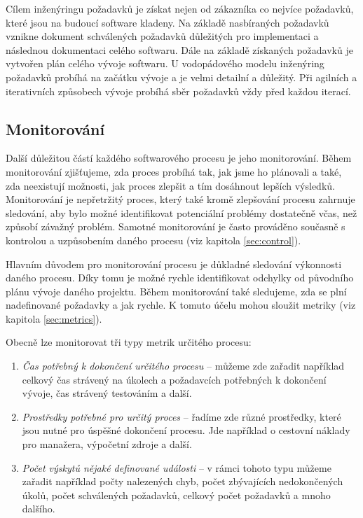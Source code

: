 \documentclass[czech,master,public,dept460,male,cpdeclaration,oneside]{diploma}
\begin{document}
Cílem inženýringu požadavků je získat nejen od zákazníka co nejvíce požadavků, které jsou na budoucí software kladeny. Na základě nasbíraných požadavků vznikne dokument schválených požadavků důležitých pro implementaci a následnou dokumentaci celého softwaru. Dále na základě získaných požadavků je vytvořen plán celého vývoje softwaru. U vodopádového modelu inženýring požadavků probíhá na začátku vývoje a je velmi detailní a důležitý. Při agilních a iterativních způsobech vývoje probíhá sběr požadavků vždy před každou iterací.

\subsection{Monitorování}
Další důležitou částí každého softwarového procesu je jeho monitorování. Během monitorování zjišťujeme, zda proces probíhá tak, jak jsme ho plánovali a také, zda neexistují možnosti, jak proces zlepšit a tím dosáhnout lepších výsledků. Monitorování je nepřetržitý proces, který také kromě zlepšování procesu zahrnuje sledování, aby bylo možné identifikovat potenciální problémy dostatečně včas, než způsobí závažný problém. Samotné monitorování je často prováděno současně s kontrolou a uzpůsobením daného procesu (viz kapitola \ref{sec:control}).

Hlavním důvodem pro monitorování procesu je důkladné sledování výkonnosti daného procesu. Díky tomu je možné rychle identifikovat odchylky od původního plánu vývoje daného projektu. Během monitorování také sledujeme, zda se plní nadefinované požadavky a jak rychle. K tomuto účelu mohou sloužit metriky (viz kapitola \ref{sec:metrics}).

Obecně lze monitorovat tři typy metrik určitého procesu:

\begin{enumerate}
\item \textit{Čas potřebný k dokončení určitého procesu} -- můžeme zde zařadit například celkový čas strávený na úkolech a požadavcích potřebných k dokončení vývoje, čas strávený testováním a další.

\item \textit{Prostředky potřebné pro určitý proces} -- řadíme zde různé prostředky, které jsou nutné pro úspěšné dokončení procesu. Jde například o cestovní náklady pro manažera, výpočetní zdroje a další.

\item \textit{Počet výskytů nějaké definované události} -- v rámci tohoto typu můžeme zařadit například počty nalezených chyb, počet zbývajících nedokončených úkolů, počet schválených požadavků, celkový počet požadavků a mnoho dalšího.
\end{enumerate}
\end{document}
